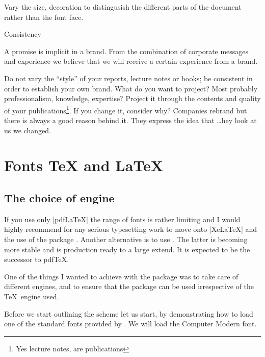 \begin{Rule}
Vary the size, decoration to distingusish the different parts of the document rather than the font face.
\end{Rule}

\begin{Rule} Consistency
\end{Rule}
A promise is implicit in a brand. From the combination of corporate messages and experience we believe that we will receive a certain experience from a brand.

Do not vary the \enquote{style} of your reports, lecture notes or books; be consistent in order to establish 
your own brand. What do you want to project? Most probably professionalism, knowledge, expertise? Project it through the contents and quality of your publications\footnote{Yes lecture notes, are publications}. If you change it, consider why? Companies rebrand but there is always a good reason behind it. They express the idea that \ldots hey look at us we changed.

\chapter{Fonts TeX and LaTeX}

\section{The choice of engine}

If you use only |pdfLaTeX| the range of fonts is rather limiting and I would highly recommend for any serious typesetting work to move onto |XeLaTeX| and the use of the package  \citep{fontspec}. Another alternative is to use \lualatex. The latter is becoming more stable and is production ready to a large extend. It is expected to be the successor to pdfTeX.

One of the things I wanted to achieve with the  package was  to take care of different \tex engines, and to ensure that the package can be used irrespective of the \TeX\ engine used. 

Before we start outlining the scheme let us start, by demonstrating how to load one of the standard fonts provided by \latexe. We will load the Computer Modern font. 


